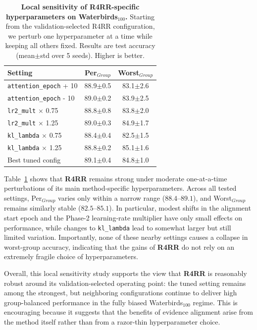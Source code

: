 \documentclass[10pt,twocolumn,letterpaper]{article}
\begin{document}
\begin{table}[h]
\centering
\caption{\textbf{Local sensitivity of R4RR-specific hyperparameters on Waterbirds$_{100}$.} Starting from the validation-selected R4RR configuration, we perturb one hyperparameter at a time while keeping all others fixed. Results are test accuracy (mean$\pm$std over 5 seeds). Higher is better.}
\label{tab:r4rr_local_sensitivity}
\small
\setlength{\tabcolsep}{8pt}
\renewcommand{\arraystretch}{1.1}
\begin{tabular}{lcc}
\toprule
\textbf{Setting} & \textbf{Per$_{Group}$} & \textbf{Worst$_{Group}$} \\
\midrule
\texttt{attention\_epoch} + 10 & 88.9\scriptsize$\pm$0.5 & 83.1\scriptsize$\pm$2.6 \\
\texttt{attention\_epoch} - 10 & 89.0\scriptsize$\pm$0.2 & 83.9\scriptsize$\pm$2.5 \\
\texttt{lr2\_mult} $\times$ 0.75 & 88.8\scriptsize$\pm$0.8 & 83.8\scriptsize$\pm$2.0 \\
\texttt{lr2\_mult} $\times$ 1.25 & 89.0\scriptsize$\pm$0.3 & 84.9\scriptsize$\pm$1.7 \\
\texttt{kl\_lambda} $\times$ 0.75 & 88.4\scriptsize$\pm$0.4 & 82.5\scriptsize$\pm$1.5 \\
\texttt{kl\_lambda} $\times$ 1.25 & 88.8\scriptsize$\pm$0.2 & 85.1\scriptsize$\pm$1.6 \\
\midrule
Best tuned config & 89.1\scriptsize$\pm$0.4 & 84.8\scriptsize$\pm$1.0 \\
\bottomrule
\end{tabular}
\end{table}

Table~\ref{tab:r4rr_local_sensitivity} shows that \textbf{R4RR} remains strong under moderate one-at-a-time perturbations of its main method-specific hyperparameters. Across all tested settings, Per$_{Group}$ varies only within a narrow range ($88.4$--$89.1$), and Worst$_{Group}$ remains similarly stable ($82.5$--$85.1$). In particular, modest shifts in the alignment start epoch and the Phase-2 learning-rate multiplier have only small effects on performance, while changes to \texttt{kl\_lambda} lead to somewhat larger but still limited variation. Importantly, none of these nearby settings causes a collapse in worst-group accuracy, indicating that the gains of \textbf{R4RR} do not rely on an extremely fragile choice of hyperparameters.

Overall, this local sensitivity study supports the view that \textbf{R4RR} is reasonably robust around its validation-selected operating point: the tuned setting remains among the strongest, but neighboring configurations continue to deliver high group-balanced performance in the fully biased Waterbirds$_{100}$ regime. This is encouraging because it suggests that the benefits of evidence alignment arise from the method itself rather than from a razor-thin hyperparameter choice.
\end{document}
